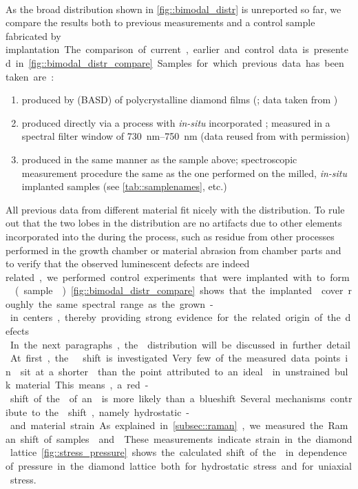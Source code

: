 	\\
	As the broad \ZPL distribution shown in \autoref{fig::bimodal_distr} is unreported so far, we compare the results both to previous measurements and a control sample fabricated by \si implantation.
	The comparison of current, earlier and control data is presented in \autoref{fig::bimodal_distr_compare}.
	Samples for which previous data has been taken are:
	\begin{enumerate}
		\item \nds produced by \basd (BASD) of polycrystalline \CVD diamond films (\cite{Neu2011a}; data taken from \cite{Benedikter2017a})
		\item \nds produced directly via a \CVD process with \textit{in-situ} incorporated \sivs; measured in a spectral filter window of \SIrange{730}{750}{nm} (data reused from \cite{Neu2012} with permission)
		\item \nds produced in the same manner as the sample above; spectroscopic measurement procedure the same as the one performed on the milled, \textit{in-situ} implanted samples (see \autoref{tab::samplenames}, \insituF etc.)
	\end{enumerate}
	All previous data from different \nd material fit nicely with the \ZPL distribution.
	To rule out that the two lobes in the distribution are no artifacts due to other elements incorporated into the \nds during the process, such as residue from other processes performed in the growth chamber or material abrasion from chamber parts and to verify that the observed luminescent defects are indeed \si related, we performed control experiments that were implanted with \si to form \sivs (sample \implantedTao).
	\autoref{fig::bimodal_distr_compare} shows that the implanted \sivs cover roughly the same spectral range as the grown-in centers, thereby providing strong evidence for the \si related origin of the defects.
	\\
	In the next paragraphs, the \ZPL distribution will be discussed in further detail.
	At first, the \ZPL \cwl shift is investigated.
	Very few of the measured data points in \vl sit at a shorter \cwl than the point attributed to an ideal \siv in unstrained bulk material.
	This means, a red-shift of the \ZPL of an \siv is more likely than a blueshift.
	Several mechanisms contribute to the \cwl shift, namely hydrostatic- and material strain.
	As explained in \autoref{subsec::raman}, we measured the Raman shift of samples \insituS and \implantedTao.
	These measurements indicate strain in the diamond lattice.
	\autoref{fig::stress_pressure} shows the calculated shift of the  \ZPL in dependence of pressure in the diamond lattice both for hydrostatic stress and for uniaxial stress.
